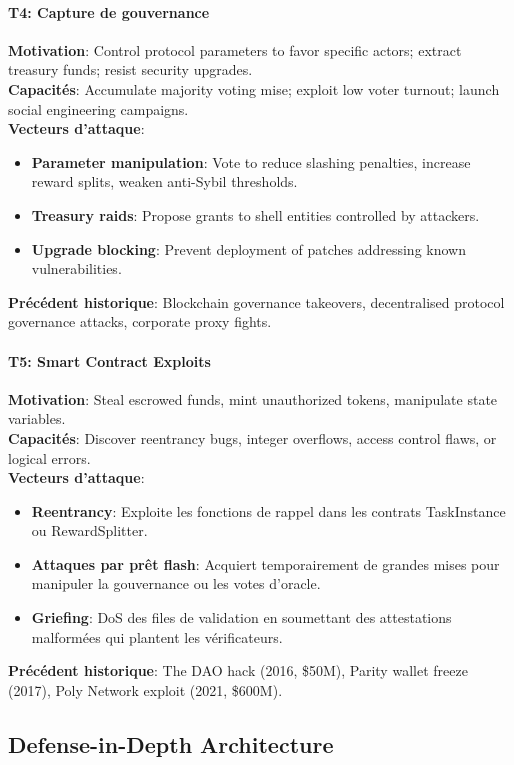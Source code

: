 \documentclass[11pt]{article}
\begin{document}
\paragraph{T4: Capture de gouvernance}
\textbf{Motivation}: Control protocol parameters to favor specific actors; extract treasury funds; resist security upgrades.\\
\textbf{Capacités}: Accumulate majority voting mise; exploit low voter turnout; launch social engineering campaigns.\\
\textbf{Vecteurs d'attaque}:
\begin{itemize}[noitemsep]
  \item \textbf{Parameter manipulation}: Vote to reduce slashing penalties, increase reward splits, weaken anti-Sybil thresholds.
  \item \textbf{Treasury raids}: Propose grants to shell entities controlled by attackers.
  \item \textbf{Upgrade blocking}: Prevent deployment of patches addressing known vulnerabilities.
\end{itemize}
\textbf{Précédent historique}: Blockchain governance takeovers, decentralised protocol governance attacks, corporate proxy fights.

\paragraph{T5: Smart Contract Exploits}
\textbf{Motivation}: Steal escrowed funds, mint unauthorized tokens, manipulate state variables.\\
\textbf{Capacités}: Discover reentrancy bugs, integer overflows, access control flaws, or logical errors.\\
\textbf{Vecteurs d'attaque}:
\begin{itemize}[noitemsep]
  \item \textbf{Reentrancy}: Exploite les fonctions de rappel dans les contrats TaskInstance ou RewardSplitter.
  \item \textbf{Attaques par prêt flash}: Acquiert temporairement de grandes mises pour manipuler la gouvernance ou les votes d'oracle.
  \item \textbf{Griefing}: DoS des files de validation en soumettant des attestations malformées qui plantent les vérificateurs.
\end{itemize}
\textbf{Précédent historique}: The DAO hack (2016, \$50M), Parity wallet freeze (2017), Poly Network exploit (2021, \$600M).

\subsection{Defense-in-Depth Architecture}
\end{document}
